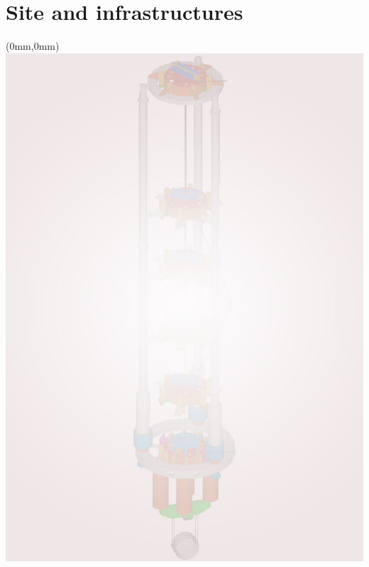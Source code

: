 \documentclass[color,DIV12,pdftex,a4paper]{ET-DS}
\begin{document}
\section{Site and infrastructures } \label{sec:SiteInfra}

%
\cleardoublepage 
\FloatBarrier
%
%
\begin{textblock*}{297mm}(0mm,0mm)   \includegraphics[width=\paperwidth]{Sec_Suspensions/Figures/SuspensionBackgroundFirstPage.jpg}
\end{textblock*}
%
\end{document}
